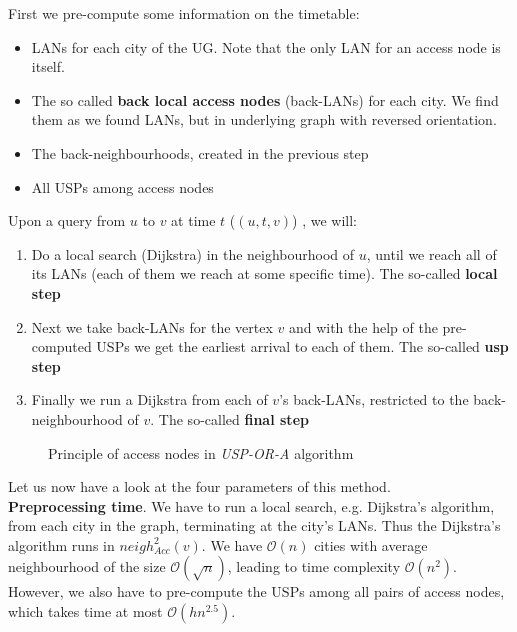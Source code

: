 	    First we pre-compute some information on the timetable:
	    \begin{itemize}
	    	\item LANs for each city of the UG. Note that the only LAN for an access node is itself.
	    	\item The so called \textbf{back local access nodes} (back-LANs) for each city. We find them as we found LANs, but in underlying graph with reversed orientation.
	    	\item The back-neighbourhoods, created in the previous step
	    	\item All USPs among access nodes
	    \end{itemize}
	    \hspace{\fill}
	    
	    Upon a query from $u$ to $v$ at time $t$ ($(u, t, v)$) , we will:
	    \begin{enumerate}
	    	\item Do a local search (Dijkstra) in the neighbourhood of $u$, until we reach all of its LANs (each of them we reach at some specific time). The so-called \textbf{local step}
	    	\item Next we take back-LANs for the vertex $v$ and with the help of the pre-computed USPs we get the earliest arrival to each of them. The so-called \textbf{usp step}
	    	\item Finally we run a Dijkstra from each of $v$'s back-LANs, restricted to the back-neighbourhood of $v$. The so-called \textbf{final step}
	    \end{enumerate}
	    \hspace{\fill}
	    
	    \begin{figure}[h!]
		\begin{center}
		\end{center}
		\caption{\label{fig:uspora} Principle of access nodes in \textit{USP-OR-A} algorithm}
	\end{figure}
	
	Let us now have a look at the four parameters of this method. \\
	
	\textbf{Preprocessing time}. We have to run a local search, e.g. Dijkstra's algorithm, from each city in the graph, terminating at the city's LANs. Thus the Dijkstra's algorithm runs in $neigh_{Acc}^{2}(v)$. We have $\mathcal{O}(n)$ cities with average neighbourhood of the size $\mathcal{O}(\sqrt{n})$, leading to time complexity $\mathcal{O}(n^{2})$. However, we also have to pre-compute the USPs among all pairs of access nodes, which takes time at most $\mathcal{O}(hn^{2.5})$. \\
	
